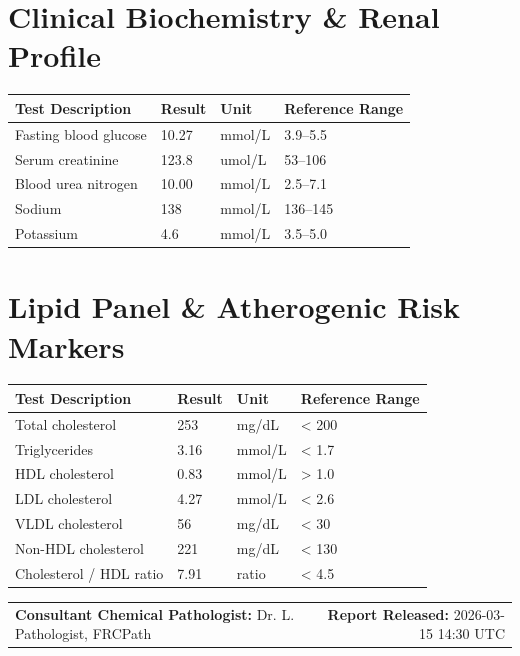 \documentclass[10pt,a4paper]{article}
\begin{document}
\vspace{8pt}

\section*{Clinical Biochemistry \& Renal Profile}

\begin{tabular}{@{} p{6.4cm} p{2.5cm} p{2.5cm} p{3.1cm} @{}}
  \toprule
  \textbf{Test Description} & \textbf{Result} & \textbf{Unit} & \textbf{Reference Range} \\
  \midrule
  Fasting blood glucose & 10.27 & mmol/L & 3.9--5.5 \\
  Serum creatinine & 123.8 & umol/L & 53--106 \\
  Blood urea nitrogen & 10.00 & mmol/L & 2.5--7.1 \\
  Sodium & 138 & mmol/L & 136--145 \\
  Potassium & 4.6 & mmol/L & 3.5--5.0 \\
  \bottomrule
\end{tabular}

\vspace{8pt}

\section*{Lipid Panel \& Atherogenic Risk Markers}

\begin{tabular}{@{} p{6.4cm} p{2.5cm} p{2.5cm} p{3.1cm} @{}}
  \toprule
  \textbf{Test Description} & \textbf{Result} & \textbf{Unit} & \textbf{Reference Range} \\
  \midrule
  Total cholesterol & 253 & mg/dL & < 200 \\
  Triglycerides & 3.16 & mmol/L & < 1.7 \\
  HDL cholesterol & 0.83 & mmol/L & > 1.0 \\
  LDL cholesterol & 4.27 & mmol/L & < 2.6 \\
  VLDL cholesterol & 56 & mg/dL & < 30 \\
  Non-HDL cholesterol & 221 & mg/dL & < 130 \\
  Cholesterol / HDL ratio & 7.91 & ratio & < 4.5 \\
  \bottomrule
\end{tabular}

\vspace{14pt}

\noindent
\begin{tabular*}{\textwidth}{@{} l @{\extracolsep{\fill}} r @{}}
  \textbf{Consultant Chemical Pathologist:} Dr. L. Pathologist, FRCPath & \textbf{Report Released:} 2026-03-15 14:30 UTC \\
\end{tabular*}
\end{document}
